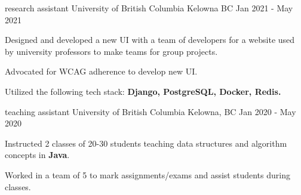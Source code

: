 \begin{cventries}


  \cventry
    {research assistant} %
    {University of British Columbia} %
    {Kelowna BC} %
    {Jan 2021 - May 2021} %
    {
      \begin{cvitems} %
        \item {Designed and developed a new UI with a team of developers for a website used by university professors to make teams for group projects.}     
        \item {Advocated for WCAG adherence to develop new UI.}     
        \item {Utilized the following tech stack:  \textbf{Django, PostgreSQL, Docker, Redis.}}
      \end{cvitems}
    }


  \cventry
    {teaching assistant} %
    {University of British Columbia} %
    {Kelowna, BC} %
    {Jan 2020 - May 2020} %
    {
      \begin{cvitems} %
        \item {Instructed 2 classes of 20-30 students teaching data structures and algorithm concepts in \textbf{Java}.} 
        \item {Worked in a team of 5 to mark assignments/exams and assist students during classes.} 
      \end{cvitems}
    }


\end{cventries}
